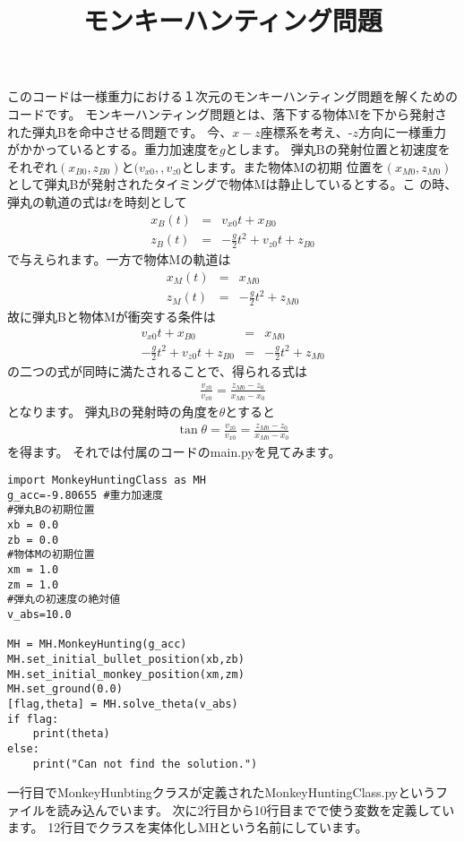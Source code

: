 \documentclass{jarticle}
\title{モンキーハンティング問題}
\author{}
\date{}
\begin{document}
\maketitle
このコードは一様重力における１次元のモンキーハンティング問題を解くためのコードです。
モンキーハンティング問題とは、落下する物体Mを下から発射された弾丸Bを命中させる問題です。
今、$x-z$座標系を考え、-$z$方向に一様重力がかかっているとする。重力加速度を$g$とします。
弾丸Bの発射位置と初速度をそれぞれ$(x_{B0},z_{B0})$と$(v_{x0},,v_{z0}$とします。また物体Mの初期
位置を$(x_{M0},z_{M0})$として弾丸Bが発射されたタイミングで物体Mは静止しているとする。こ
の時、弾丸の軌道の式は$t$を時刻として
\begin{eqnarray}
x_{B}(t)&=&v_{x0}t+x_{B0}\\
z_{B}(t)&=&-\frac{g}{2}t^{2}+v_{z0}t+z_{B0}
\end{eqnarray}
で与えられます。一方で物体Mの軌道は
\begin{eqnarray}
x_{M}(t)&=&x_{M0}\\
z_{M}(t)&=&-\frac{g}{2}t^{2}+z_{M0}
\end{eqnarray}
故に弾丸Bと物体Mが衝突する条件は
\begin{eqnarray}
v_{x0}t+x_{B0}&=&x_{M0}\\
-\frac{g}{2}t^{2}+v_{z0}t+z_{B0}&=&-\frac{g}{2}t^{2}+z_{M0}
\end{eqnarray}
の二つの式が同時に満たされることで、得られる式は
\begin{eqnarray}
\frac{v_{z0}}{v_{x0}}=\frac{z_{M0}-z_{0}}{x_{M0}-x_{0}}
\end{eqnarray}
となります。
弾丸Bの発射時の角度を$\theta$とすると
\begin{eqnarray}
\tan\theta=\frac{v_{z0}}{v_{x0}}=\frac{z_{M0}-z_{0}}{x_{M0}-x_{0}}
\end{eqnarray}
を得ます。
それでは付属のコードのmain.pyを見てみます。
\begin{lstlisting}[caption=test,label=test]
import MonkeyHuntingClass as MH
g_acc=-9.80655 #重力加速度
#弾丸Bの初期位置
xb = 0.0 
zb = 0.0
#物体Mの初期位置
xm = 1.0
zm = 1.0
#弾丸の初速度の絶対値
v_abs=10.0

MH = MH.MonkeyHunting(g_acc)
MH.set_initial_bullet_position(xb,zb)
MH.set_initial_monkey_position(xm,zm)
MH.set_ground(0.0)
[flag,theta] = MH.solve_theta(v_abs)
if flag:
    print(theta)
else:
    print("Can not find the solution.")
 \end{lstlisting}
 一行目でMonkeyHunbtingクラスが定義されたMonkeyHuntingClass.pyというファイルを読み込んでいます。
 次に2行目から10行目までで使う変数を定義しています。
12行目でクラスを実体化しMHという名前にしています。
\end{document}
